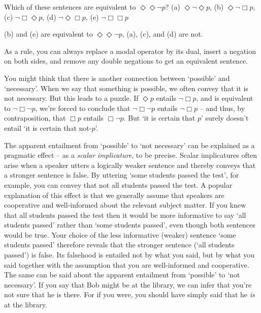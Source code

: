 \begin{exercise}
  Which of these sentences are equivalent to $\Diamond\Diamond \neg p$? (a)
  $\Diamond \neg \Diamond p$, (b) $\Diamond\neg \Box p$, (c)
  $\neg\Box\Diamond p$, (d) $\neg\Diamond\Box p$, (e) $\neg\Box\Box p$
\end{exercise}
\begin{solution}
  (b) and (e) are equivalent to $\Diamond\Diamond \neg p$, (a), (c), and (d) are
  not.
  
  As a rule, you can always replace a modal operator by its dual, insert a
  negation on both sides, and remove any double negations to get an equivalent
  sentence.
\end{solution}

You might think that there is another connection between `possible' and
`necessary'. When we say that something is possible, we often convey that it is
not necessary. But this leads to a puzzle. If $\Diamond p$ entails
$\neg \Box p$, and is equivalent to $\neg \Box \neg p$, we're forced to conclude
that $\neg\Box\neg p$ entails $\neg\Box p$ -- and thus, by contraposition, that
$\Box p$ entails $\Box \neg p$. But `it is certain that $p$' surely doesn't entail `it is certain that not-$p$'.

The apparent entailment from `possible' to `not necessary' can be explained as a
pragmatic effect -- as a \emph{scalar implicature}, to be precise. Scalar
implicatures often arise when a speaker utters a logically weaker sentence and
thereby conveys that a stronger sentence is false. By uttering `some students
passed the test', for example, you can convey that not all students passed the
test. A popular explanation of this effect is that we generally assume that
speakers are cooperative and well-informed about the relevant subject matter. If
you knew that all students passed the test then it would be more informative to
say `all students passed' rather than `some students passed', even though both
sentences would be true. Your choice of the less informative (weaker) sentence
`some students passed' therefore reveals that the stronger sentence (`all
students passed') is false. Its falsehood is entailed not by what you said, but
by what you said together with the assumption that you are well-informed and
cooperative. The same can be said about the apparent entailment from `possible'
to `not necessary'. If you say that Bob might be at the library, we can infer
that you're not sure that he is there. For if you were, you should have simply
said that he \emph{is} at the library.

